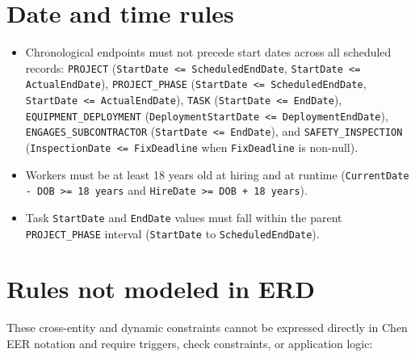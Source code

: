 \documentclass[a4paper,12pt]{report}
\providecommand{\tightlist}{%
  \setlength{\itemsep}{0pt}\setlength{\parskip}{0pt}}
\begin{document}
\section{Date and time rules}\label{date-and-time-rules}

\begin{itemize}
\tightlist
\item
  Chronological endpoints must not precede start dates across all scheduled records: \texttt{PROJECT} (\allowbreak{}\texttt{StartDate \textless= ScheduledEndDate}, \texttt{StartDate \textless= ActualEndDate}), \texttt{PROJECT\_\allowbreak{}PHASE} (\allowbreak{}\texttt{StartDate \textless= ScheduledEndDate}, \texttt{StartDate \textless= ActualEndDate}), \texttt{TASK} (\allowbreak{}\texttt{StartDate \textless= EndDate}), \texttt{EQUIPMENT\_\allowbreak{}DEPLOYMENT} (\allowbreak{}\texttt{DeploymentStartDate \textless= DeploymentEndDate}), \texttt{ENGAGES\_\allowbreak{}SUBCONTRACTOR} (\allowbreak{}\texttt{StartDate \textless= EndDate}), and \texttt{SAFETY\_\allowbreak{}INSPECTION} (\allowbreak{}\texttt{InspectionDate \textless= FixDeadline} when \texttt{FixDeadline} is non-null).
\item
  Workers must be at least 18 years old at hiring and at runtime (\allowbreak{}\texttt{CurrentDate - DOB \textgreater= 18 years} and \texttt{HireDate \textgreater= DOB + 18 years}).
\item
  Task \texttt{StartDate} and \texttt{EndDate} values must fall within the parent \texttt{PROJECT\_\allowbreak{}PHASE} interval (\allowbreak{}\texttt{StartDate} to \texttt{ScheduledEndDate}).
\end{itemize}

\section{Rules not modeled in ERD}\label{rules-not-modeled-in-erd}

These cross-entity and dynamic constraints cannot be expressed directly in Chen EER notation and require triggers, check constraints, or application logic:
\end{document}
